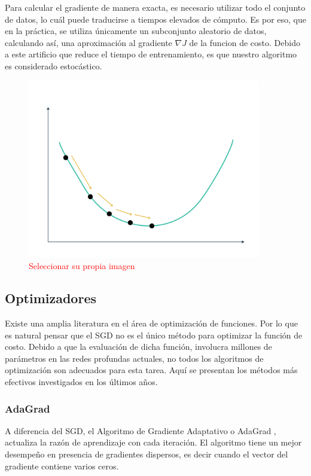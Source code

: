 Para calcular el gradiente de manera exacta, es necesario utilizar todo el conjunto de datos, lo cuál puede traducirse a tiempos elevados de cómputo. Es por eso, que en la práctica, se utiliza únicamente un subconjunto aleatorio de datos, calculando así, una aproximación al gradiente $\nabla J$ de la funcion de costo. Debido a este artificio que reduce el tiempo de entrenamiento, es que nuestro algoritmo es considerado estocástico.
\begin{figure}[H]
    \centering
    \includegraphics[width=4in]{../cap2_CNNs/src/sgd.png}
    \caption{\textcolor{red}{Seleccionar su propia imagen}} 
\end{figure}
\subsection{Optimizadores}
\label{subsection:optimizadores}
Existe una amplia literatura en el área de optimización de funciones. Por lo que es natural pensar que el SGD no es el único método para optimizar la función de costo. Debido a que la evaluación de dicha función, involucra millones de parámetros en las redes profundas actuales, no todos los algoritmos de optimización son adecuados para esta tarea. Aquí se presentan los métodos más efectivos investigados en los últimos años.

\subsubsection{AdaGrad}
A diferencia del SGD, el Algoritmo de Gradiente Adaptativo o AdaGrad \cite{adagrad}, actualiza la razón de aprendizaje con cada iteración. El algoritmo tiene un mejor desempeño en presencia de gradientes dispersos, es decir cuando el vector del gradiente contiene varios ceros.


